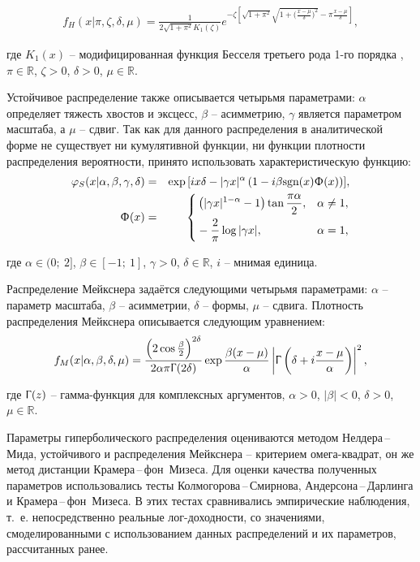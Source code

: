 \begin{eqnarray}\label{hpdf} 
f_H(x|\pi,\zeta,\delta,\mu)=\frac{1}{2 \sqrt{1+\pi^2} 
K_1(\zeta) }e^{-\zeta \left[ \sqrt{1+\pi^2}
\sqrt{1+\big(\frac{x-\mu}{\delta})^2}-
\pi\frac{x-\mu}{\delta}\right]},
\end{eqnarray}

\noindent где $K_1(x)$ -- модифицированная функция Бесселя третьего рода 1-го порядка \cite{Bessel1824}, $\pi \in \mathbb{R}$, $\zeta > 0$, $\delta > 0$, $\mu \in \mathbb{R}$.

Устойчивое распределение также описывается четырьмя параметрами: $\alpha$ определяет тяжесть хвостов и эксцесс, $\beta$ -- асимметрию, $\gamma$ является параметром масштаба, а $\mu$ -- сдвиг. Так как для данного распределения в аналитической форме не существует ни кумулятивной функции, ни функции плотности распределения вероятности, принято использовать характеристическую функцию:
%
\begin{eqnarray}\label{StChF} 
\varphi_S(x|\alpha,\beta,\gamma,\delta) &=& \exp{\left[ix\delta-|\gamma x|^\alpha \left(1 - i\beta\text{sgn}(x)\Upphi(x)\right)\right]}, \\
\Upphi(x) &=& \left\{ \begin{aligned}
    & \left(|\gamma x|^{1-\alpha} - 1\right)\tan{\frac{\pi\alpha}{2}}, & & \alpha \ne 1, \\
    & -\frac{2}{\pi}\log{|\gamma x|}, & & \alpha = 1,
\end{aligned} \right. \nonumber
\end{eqnarray}

\noindent где $\alpha \in (0;\ 2]$, $\beta \in [-1;\ 1]$, $\gamma > 0$, $\delta \in \mathbb{R}$, $i$ -- мнимая единица.

Распределение Мейкснера задаётся следующими четырьмя параметрами: $\alpha$ -- параметр масштаба, $\beta$ -- асимметрии, $\delta$ -- формы, $\mu$ -- сдвига. Плотность распределения Мейкснера описывается следующим уравнением:
%
\begin{equation} \label{mpdf}
    f_M(x|\alpha,\beta,\delta,\mu)=\frac{\left(2\cos{\frac{\beta}{2}}\right)^{2\delta}}{2\alpha\pi\Upgamma(2\delta)}\exp{\frac{\beta(x-\mu)}{\alpha}}\left|\Upgamma\left(\delta + i\frac{x-\mu}{\alpha}\right)\right|^2,
\end{equation}

\noindent где $\Upgamma(z)$ -- гамма-функция для комплексных аргументов, $\alpha > 0$, $|\beta| < 0$, $\delta > 0$, $\mu \in \mathbb{R}$.

Параметры гиперболического распределения оцениваются методом Нелдера\,--\,Мида, устойчивого и распределения Мейкснера -- критерием омега-квадрат, он же метод дистанции Крамера\,--\,фон~Мизеса. 
Для оценки качества полученных параметров использовались тесты Колмогорова\,--\,Смирнова, Андерсона\,--\,Дарлинга и Крамера\,--\,фон~Мизеса. 
В этих тестах сравнивались эмпирические наблюдения, т.~е. непосредственно реальные лог-доходности, со значениями, смоделированными с использованием данных распределений и их параметров, рассчитанных ранее. 

